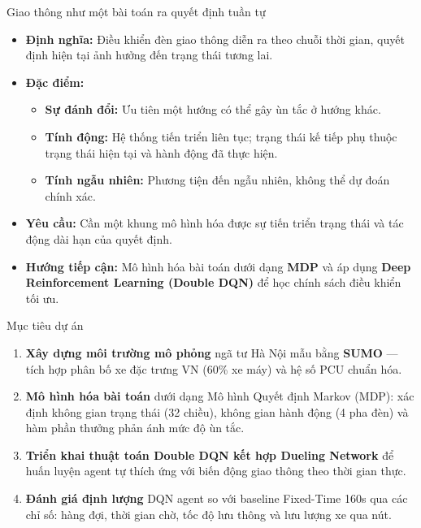 \begin{frame}{Giao thông như một bài toán ra quyết định tuần tự}
\begin{itemize}
    \item \textbf{Định nghĩa:} Điều khiển đèn giao thông diễn ra theo chuỗi thời gian, quyết định hiện tại ảnh hưởng đến trạng thái tương lai.
    \item \textbf{Đặc điểm:}
    \begin{itemize}
        \item \textbf{Sự đánh đổi:} Ưu tiên một hướng có thể gây ùn tắc ở hướng khác.
        \item \textbf{Tính động:} Hệ thống tiến triển liên tục; trạng thái kế tiếp phụ thuộc trạng thái hiện tại và hành động đã thực hiện.
        \item \textbf{Tính ngẫu nhiên:} Phương tiện đến ngẫu nhiên, không thể dự đoán chính xác.
    \end{itemize}
    \item \textbf{Yêu cầu:} Cần một khung mô hình hóa được sự tiến triển trạng thái và tác động dài hạn của quyết định.
    \item \textbf{Hướng tiếp cận:} Mô hình hóa bài toán dưới dạng \textbf{MDP} và áp dụng \textbf{Deep Reinforcement Learning (Double DQN)} để học chính sách điều khiển tối ưu.
\end{itemize}
\end{frame}

\begin{frame}{Mục tiêu dự án}
\begin{enumerate}
    \item \textbf{Xây dựng môi trường mô phỏng} ngã tư Hà Nội mẫu bằng \textbf{SUMO} — tích hợp phân bố xe đặc trưng VN (60\% xe máy) và hệ số PCU chuẩn hóa.

    \vspace{4pt}
    \item \textbf{Mô hình hóa bài toán} dưới dạng Mô hình Quyết định Markov (MDP): xác định không gian trạng thái (32 chiều), không gian hành động (4 pha đèn) và hàm phần thưởng phản ánh mức độ ùn tắc.

    \vspace{4pt}
    \item \textbf{Triển khai thuật toán Double DQN kết hợp Dueling Network} để huấn luyện agent tự thích ứng với biến động giao thông theo thời gian thực.

    \vspace{4pt}
    \item \textbf{Đánh giá định lượng} DQN agent so với baseline Fixed-Time 160s qua các chỉ số: hàng đợi, thời gian chờ, tốc độ lưu thông và lưu lượng xe qua nút.
\end{enumerate}
\end{frame}
